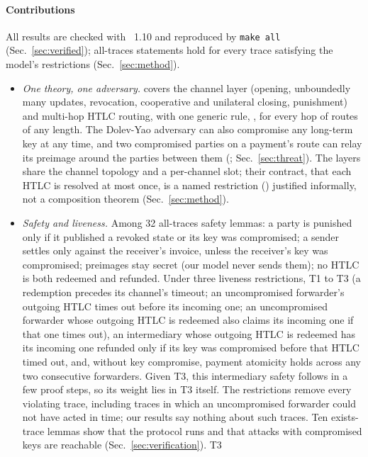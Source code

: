 \paragraph{Contributions}
All results are checked with \tamarin~1.10 and reproduced by \texttt{make all}
(Sec.~\ref{sec:verified}); all-traces statements hold for every trace
satisfying the model's restrictions (Sec.~\ref{sec:method}).
\begin{itemize}[\setlength{\IEEElabelindent}{0pt}]
\item \emph{One theory, one adversary.}  covers the
  channel layer (opening, unboundedly many updates, revocation, cooperative and
  unilateral closing, punishment) and multi-hop HTLC routing, with one generic
  rule, , for every hop of routes of any length. The
  Dolev-Yao adversary can also compromise any long-term key at any time, and
  two compromised parties on a payment's route can relay its preimage around
  the parties between them (; Sec.~\ref{sec:threat}). The layers share
  the channel topology and a per-channel slot; their contract, that each HTLC
  is resolved at most once, is a named restriction ()
  justified informally, not a composition theorem (Sec.~\ref{sec:method}).
\item \emph{Safety and liveness.} Among 32 all-traces safety lemmas: a party is
  punished only if it published a revoked state or its key was compromised; a
  sender settles only against the receiver's invoice, unless the receiver's
  key was compromised; preimages stay secret (our model never sends them); no
  HTLC is both redeemed and refunded. Under three liveness restrictions, T1 to
  T3 (a redemption precedes its channel's timeout; an uncompromised forwarder's
  outgoing HTLC times out before its incoming one; an uncompromised forwarder
  whose outgoing HTLC is redeemed also claims its incoming one if that one
  times out), an intermediary
  whose outgoing HTLC is redeemed has its incoming one
  refunded only if its key was compromised before that HTLC timed out, and,
  without key compromise, payment atomicity holds across any two consecutive
  forwarders. Given T3, this intermediary safety follows in a few proof steps,
  so its weight lies in T3 itself. The restrictions
  remove every violating trace, including traces in which an uncompromised
  forwarder could not have acted in time; our results say nothing about such
  traces. Ten exists-trace lemmas show that the protocol runs and that attacks
  with compromised keys are reachable (Sec.~\ref{sec:verification}). T3

\end{itemize}
